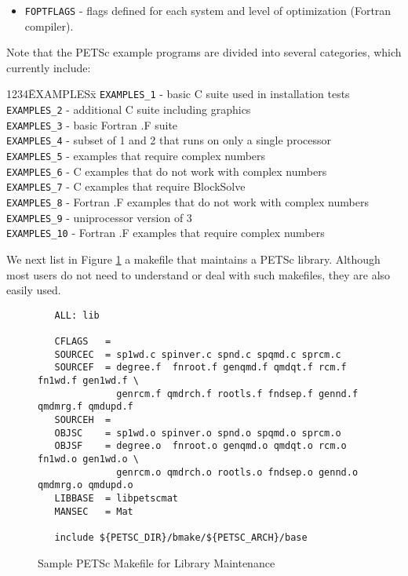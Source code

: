 {\begin{itemize}
                        optimization (C/C++ compiler).
\item {\tt FOPTFLAGS} - flags defined for each system and level of 
                        optimization (Fortran compiler).
\end{itemize}
Note that the PETSc example programs are divided into several
categories, which currently include: 
\begin{tabbing}
1234\= EXAMPLESx\= \kill
\> {\tt EXAMPLES\_1} \> - basic C suite used in installation tests\\
\> {\tt EXAMPLES\_2} \> - additional C suite including graphics\\
\> {\tt EXAMPLES\_3} \> - basic Fortran .F suite\\
\> {\tt EXAMPLES\_4} \> - subset of 1 and 2 that runs on only a single processor\\
\> {\tt EXAMPLES\_5} \> - examples that require complex numbers\\
\> {\tt EXAMPLES\_6} \> - C examples that do not work with complex numbers\\
\> {\tt EXAMPLES\_7} \> - C examples that require BlockSolve\\
\> {\tt EXAMPLES\_8} \> - Fortran .F examples that do not work with complex numbers\\
\> {\tt EXAMPLES\_9} \> - uniprocessor version of 3\\
\> {\tt EXAMPLES\_10} \> - Fortran .F examples that require complex numbers\\
\end{tabbing}

We next list in Figure \ref{fig:make3} a makefile that maintains a PETSc 
library.  Although most users do not need to understand or deal with such
makefiles, they are also easily used.

\begin{figure}[H]
{\small
\begin{verbatim}
   ALL: lib

   CFLAGS   =  
   SOURCEC  = sp1wd.c spinver.c spnd.c spqmd.c sprcm.c
   SOURCEF  = degree.f  fnroot.f genqmd.f qmdqt.f rcm.f fn1wd.f gen1wd.f \
              genrcm.f qmdrch.f rootls.f fndsep.f gennd.f qmdmrg.f qmdupd.f
   SOURCEH  = 
   OBJSC    = sp1wd.o spinver.o spnd.o spqmd.o sprcm.o
   OBJSF    = degree.o  fnroot.o genqmd.o qmdqt.o rcm.o fn1wd.o gen1wd.o \
              genrcm.o qmdrch.o rootls.o fndsep.o gennd.o qmdmrg.o qmdupd.o
   LIBBASE  = libpetscmat
   MANSEC   = Mat

   include ${PETSC_DIR}/bmake/${PETSC_ARCH}/base
\end{verbatim}
}
\caption{Sample PETSc Makefile for Library Maintenance}
\label{fig:make3}
\end{figure}

}
